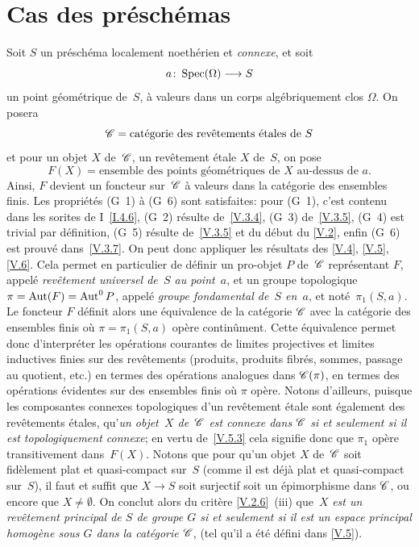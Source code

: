 \section{Cas des pr\'esch\'emas}
\label{V.7}
Soit $S$ un pr\'esch\'ema localement noeth\'erien et
\emph{connexe}, et soit
$$
a\colon \Spec(\Omega)\to S
$$
un point g\'eom\'etrique de~$S$, \`a valeurs dans un corps
alg\'ebriquement clos $\Omega$. On posera
$$
\cal{C}=\text{catégorie des revêtements étales de~$S$}
$$
et pour un objet $X$ de~$\cal{C}$, \ie un rev\^etement \'etale
$X$ de~$S$, on pose
$$
F(X)=\text{ensemble des points géométriques de~$X$ au-dessus
de~$a$.}
$$
Ainsi, $F$ devient un foncteur sur~$\cal{C}$ \`a valeurs dans la
cat\'egorie des ensembles finis. Les propri\'et\'es (G~1) \`a
(G~6) sont satisfaites: pour (G~1), c'est contenu dans les sorites de
I~\ref{I.4.6}, (G~2) r\'esulte de~\ref{V.3.4}, (G~3) de~\ref{V.3.5},
(G~4) est trivial par d\'efinition, (G~5) r\'esulte de~\ref{V.3.5} et
du d\'ebut du \No \ref{V.2}, enfin (G~6) est prouv\'e dans~\ref{V.3.7}. On
peut donc appliquer les r\'esultats des \No \ref{V.4}, \ref{V.5}, \ref{V.6}. Cela permet en
particulier de d\'efinir un pro-objet $P$ de~$\cal{C}$
repr\'esentant $F$, appel\'e \emph{revêtement universel de~$S$
au point~$a$},
et un groupe topologique $\pi=\operatorname{Aut}(F)=\operatorname{Aut}^0 P$, appel\'e
\emph{groupe fondamental de~$S$ en~$a$},
et not\'e~$\pi_1(S,a)$.
\label{indnot:eg}Le foncteur $F$ d\'efinit alors une \'equivalence de la
cat\'egorie $\cal{C}$ avec la cat\'egorie des ensembles finis
o\`u $\pi=\pi_1(S,a)$ op\`ere contin\^ument. Cette
\'equivalence permet donc d'interpr\'eter les op\'erations
courantes de limites projectives et limites inductives finies sur des
rev\^etements (produits, produits fibr\'es, sommes, passage au
quotient, etc.) en termes des op\'erations analogues dans
$\cal{C}(\pi)$, \ie en termes des op\'erations \'evidentes sur
des ensembles finis o\`u $\pi$ op\`ere. Notons d'ailleurs, puisque
les composantes connexes topologiques d'un rev\^etement \'etale
sont \'egalement des rev\^etements \'etales, qu'\emph{un \hbox{objet $X$} de~$\cal{C}$ est connexe dans $\cal{C}$ si et seulement si il est
topologiquement connexe}; en vertu de~\ref{V.5.3} cela signifie donc
que $\pi_1$ op\`ere transitivement dans~$F(X)$.
Notons que pour qu'un objet $X$ de~$\cal{C}$ soit fid\`element plat
et quasi-compact sur~$S$ (comme il est d\'ej\`a plat et
quasi-compact sur~$S$), il faut et suffit que $X\to S$ soit surjectif
\ie soit un \'epimorphisme dans $\cal{C}$, ou encore que $X\neq
\emptyset$. On conclut alors du crit\`ere \ref{V.2.6}~(iii) que~$X$
\emph{est un revêtement principal de
$S$
de groupe $G$ si et seulement si il est un espace principal
homogène sous $G$ dans la catégorie $\cal{C}$}, (tel qu'il a
\'et\'e d\'efini dans \No \ref{V.5}).

